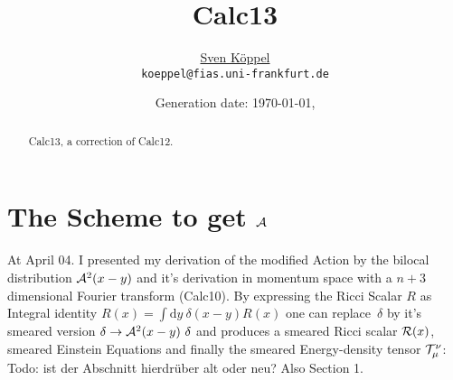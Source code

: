 \documentclass[10pt,a4paper, fleqn]{article}
\title{\vspace{-9ex} Calc13 \vspace{-1ex}} %
\author{\small %
\href{https://itp.uni-frankfurt.de/~koeppel}{Sven Köppel} \\
\small \texttt{koeppel@fias.uni-frankfurt.de}}
\date{\small Generation date: \today, \currenttime}
\begin{document}
\maketitle

\renewcommand{\d}{\mathrm{d}}
\newcommand{\dd}[2]{\frac{\mathrm{d} #1}{\mathrm{d} #2}}
\newcommand{\pp}[2]{\frac{\partial #1}{\partial #2}}
\renewcommand{\L}{L_P}
\newcommand{\pr}{p_r}
\newcommand{\psenk}{p_\perp}
\newcommand{\ebenso}{\biggl( ~ \therefore ~ \biggr) }
\newcommand{\metrik}[1]{\d s^2 = \left( #1 \right) \d t^2 \left( #1 \right)^{-1} \d r^2 + r^2 \d \Omega_{D-2}^2 }
\newcommand{\winkel}{r^2 \d \Omega^2}
\newcommand{\dann}{$\rightarrow~$}
\newcommand{\CA}{ {\cal A}}
\newcommand{\C}[1]{ {\cal #1}}
\newcommand{\mn}{_{\mu\nu}}

\newcommand*{\mathcolor}{}
\def\mathcolor#1#{\mathcoloraux{#1}}
\newcommand*{\mathcoloraux}[3]{%
  \protect\leavevmode
  \begingroup
    \color#1{#2}#3%
  \endgroup
}
\newcommand{\redmin}{\mathcolor{red}{-}}
\newcommand{\redplus}{\mathcolor{red}{+}}
\newcommand{\pn}{\mathcolor{OliveGreen}{+ n}}
\newcommand{\n}{ {\mathcolor{OliveGreen}{n}} }

\begin{multicols}{2}
\begin{abstract}
Calc13, a correction of Calc12.
\end{abstract}
\vfill
\columnbreak
\tableofcontents
\end{multicols}

\newpage
\section{The Scheme to get $\CA$}
At April 04. I presented my derivation of the modified Action by the bilocal distribution $\C A^2(x-y)$ and it's derivation in momentum space with a $n+3$ dimensional Fourier transform (Calc10). By expressing the Ricci Scalar $R$ as Integral identity $R(x) = \int \d y~\delta(x-y) R(x)$ one can replace~$\delta$ by it's smeared version $\delta \to \C A^2(x-y)~\delta$ and produces a smeared Ricci scalar $\C R(x)$, smeared Einstein Equations and finally the smeared Energy-density tensor $\C T_\mu^\nu$:
%
Todo: ist der Abschnitt hierdrüber alt oder neu?  Also Section 1.
\end{document}
